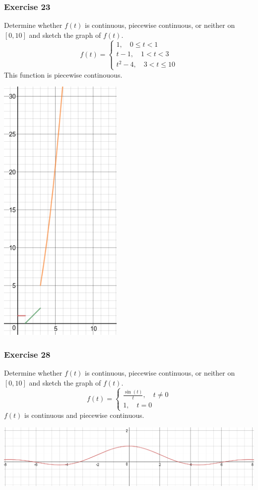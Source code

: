 \documentclass{math}
\begin{document}
\subsubsection*{Exercise 23}
Determine whether \( f(t) \) is continuous, piecewise continuous, or neither
on \( [0,10] \) and sketch the graph of \( f(t) \).
\[ f(t) = \begin{cases}
  1, \quad 0\le t<1 \\
  t-1, \quad 1<t<3 \\
  t^2-4, \quad 3<t\le10
\end{cases} \]
This function is piecewise continouous.
\begin{center}
  \includegraphics[width=6cm]{assets/hw_09_23.png}
\end{center}

\subsubsection*{Exercise 28}
Determine whether \( f(t) \) is continuous, piecewise continuous, or neither
on \( [0,10] \) and sketch the graph of \( f(t) \).
\[ f(t) = \begin{cases}
  \frac{\sin(t)}{t}, \quad t\ne0 \\
  1, \quad t = 0
\end{cases} \]
\( f(t) \) is continuous and piecewise continuous.
\begin{center}
  \includegraphics[width=16cm]{assets/hw_09_28.png}
\end{center}
\end{document}
